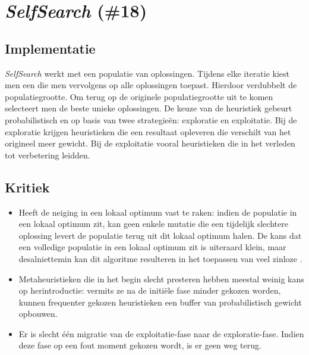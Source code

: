 \section{\emph{SelfSearch} (\#18)}
\label{sss:selfsearch}
\subsection{Implementatie}
\emph{SelfSearch}\cite{chesc-selfsearch} werkt met een populatie van oplossingen. Tijdens elke iteratie kiest men een \abllh{} die men vervolgens op alle oplossingen toepast. Hierdoor verdubbelt de populatiegrootte. Om terug op de originele populatiegrootte uit te komen selecteert men de beste unieke oplossingen. De keuze van de heuristiek gebeurt probabilistisch en op basis van twee strategie\"en: exploratie en exploitatie. Bij de exploratie krijgen heuristieken die een resultaat opleveren die verschilt van het origineel meer gewicht. Bij de exploitatie vooral heuristieken die in het verleden tot verbetering leidden.
\subsection{Kritiek}
\begin{itemize}
 \item Heeft de neiging in een lokaal optimum vast te raken: indien de populatie in een lokaal optimum zit, kan geen enkele mutatie die een tijdelijk slechtere oplossing levert de populatie terug uit dit lokaal optimum halen. De kans dat een volledige populatie in een lokaal optimum zit is uiteraard klein, maar desalniettemin kan dit algoritme resulteren in het toepassen van veel zinloze \abllh{}.
 \item Metaheuristieken die in het begin slecht presteren hebben meestal weinig kans op herintroductie: vermits ze na de initi\"ele fase minder gekozen worden, kunnen frequenter gekozen heuristieken een buffer van probabilistisch gewicht opbouwen.
 \item Er is slecht \'e\'en migratie van de exploitatie-fase naar de exploratie-fase. Indien deze fase op een fout moment gekozen wordt, is er geen weg terug.
\end{itemize}